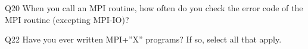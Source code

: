 \begin{description}%
\item{Q20} When you call an MPI routine, how often do you check the error code of the MPI routine  (excepting MPI-IO)?%
\item{Q22} Have you ever written MPI+”X” programs? If so, select all that apply.%
\end{description}%
